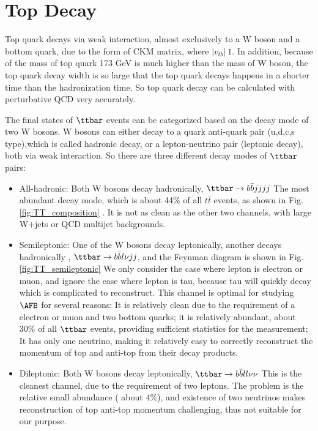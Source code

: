 \section{Top Decay}
\label{sec:Decay}
 
 Top quark decays via weak interaction, almost exclusively to a W boson and a bottom quark, due to the form of CKM matrix, where $|v_{tb}|~1$. In addition, because of the mass of top quark 173 GeV is much higher than the mass of W boson, the top quark decay width is so large that the top quark decays happens in a shorter time than the hadronization time. So top quark decay can be calculated with perturbative QCD very accurately.
 
 The final states of $\ttbar$ events can be categorized based on the decay mode of two W bosons. W bosons can either decay to a quark anti-quark pair (u,d,c,s type),which is called hadronic decay, or a lepton-neutrino pair (leptonic decay),  both via weak interaction. So there are three different decay modes of $\ttbar$ pairs:
 \begin{itemize}
 	\item All-hadronic: Both W bosons decay hadronically, $\ttbar\rightarrow b \bar b jjjj$
 	\subitem The most abundant decay mode, which is about 44\% of all $t\bar t$ events, as shown in Fig.\ref{fig:TT_composition} . It is not as clean as the other two channels, with large W+jets or QCD multijet backgrounds.
 	\item Semileptonic: One of the W bosons decay leptonically, another decays hadronically , $\ttbar \rightarrow b\bar b l\nu j j$, and the Feynman diagram is shown in Fig.\ref{fig:TT_semileptonic}
 	\subitem We only consider the case where lepton is electron or muon, and ignore the case where lepton is tau, because tau will quickly decay which is complicated to reconstruct. 
 	\subitem This channel is optimal for studying $\AFB$ for several reasons: It is relatively clean due to the requirement of a electron or muon and two bottom quarks; it is relatively abundant, about 30\% of all $\ttbar$ events, providing sufficient statistics for the measurement; It has only one neutrino, making it relatively easy to correctly reconstruct the momentum of top and anti-top from their decay products.  
 	\item Dileptonic: Both W bosons decay leptonically, $\ttbar \rightarrow b \bar b ll\nu\nu$
 	\subitem This is the cleanest channel, due to the requirement of two leptons. The problem is the relative small abundance ( about 4\%), and existence of two neutrinos makes reconstruction of top anti-top momentum challenging, thus not suitable for our purpose.  
 \end{itemize}  

